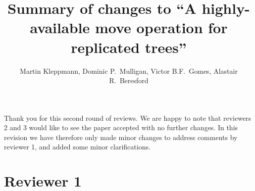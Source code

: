 \documentclass[10pt]{article}
\begin{document}
\title{Summary of changes to ``A highly-available move operation for replicated trees''}
\author{Martin Kleppmann, Dominic P.\ Mulligan, Victor B.F.\ Gomes, Alastair R.\ Beresford}
\date{}
\maketitle

Thank you for this second round of reviews.
We are happy to note that reviewers 2 and 3 would like to see the paper accepted with no further changes.
In this revision we have therefore only made minor changes to address comments by reviewer 1, and added some minor clarifications.

\section{Reviewer 1}
\end{document}
